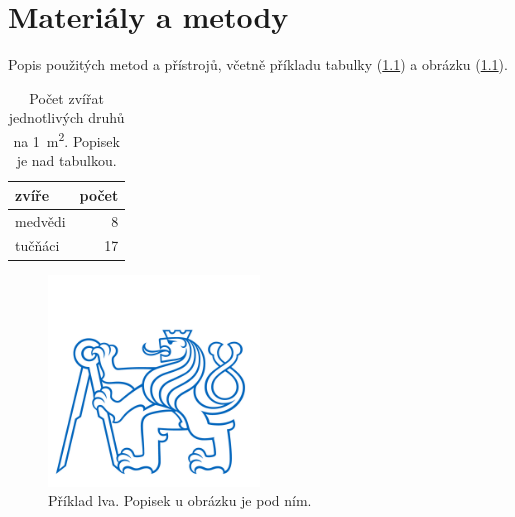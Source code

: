\chapter{Materiály a metody}
\label{sec:mam}

\noindent Popis použitých metod a přístrojů, včetně příkladu tabulky  (\ref{tab:priklad}) a obrázku (\ref{fig:priklad}).

\begin{table}[hbtp]
    \centering
    \caption{Počet zvířat jednotlivých druhů na \SI{1}{\meter\squared}. Popisek je nad tabulkou.}
    \begin{tabular}{|l|r|}\hline
        zvíře & počet \\ \hline\hline
        medvědi & 8\\
        tučňáci & 17\\\hline
    \end{tabular}
    \label{tab:priklad}
\end{table}

\begin{figure}[hbtp]
    \centering
    \includegraphics[width=0.5\textwidth]{cvut.jpg}
    \caption{Příklad lva. Popisek u obrázku je pod ním.}
    \label{fig:priklad}
\end{figure}


